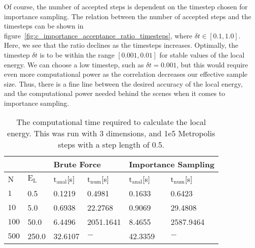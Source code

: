 \documentclass[
    a4paper, aps, twocolumn, floatfix, superscriptaddress,
    nofootinbib]{revtex4-1}
\begin{document}
Of course, the number of accepted steps is dependent on the timestep chosen for importance sampling. The relation between the number of accepted steps and the timesteps can be shown in figure~\ref{fig:c_importance_acceptance_ratio_timesteps}, where $\delta t \in [0.1, 1.0]$. Here, we see that the ratio declines as the timesteps increases. Optimally, the timestep $\delta t$ is to be within the range $[0.001, 0.01]$ for stable values of the local energy. We can choose a low timestep, such as $\delta t = 0.001$, but this would require even more computational power as the correlation decreases our effective sample size. Thus, there is a fine line between the desired accuracy of the local energy, and the computational power needed behind the scenes when it comes to importance sampling.


\begin{table}[h!]
 \caption{The computational time required to calculate the local energy. This was run with 3 dimensions, and 1e5 Metropolis steps with a step length of 0.5.}
 \begin{ruledtabular}
    \begin{tabular}{p{0.5cm}p{1.1cm}p{1.1cm}p{1.1cm}p{1.1cm}p{1.1cm}}
    \multirow{2}{*}{} &
     &
      \multicolumn{2}{l}{Brute Force} &
      \multicolumn{2}{l}{Importance Sampling} \\
    \hline
      N & $\text{E}_{\text{L}}$ & $\text{t}_{\text{anal}}$[\si{\second}] & $\text{t}_{\text{num}}$[\si{\second}]& $\text{t}_{\text{anal}}$[\si{\second}] & $\text{t}_{\text{num}}$[\si{\second}] \\
      \hline
 $1$& 0.5 &  0.1219   &  0.4981   & 0.1633  &  0.6423 \\
 $10$& 5.0 & 0.6938   &   22.2768  & 0.9069    &  29.4808 \\
 $100$& 50.0 &  6.4496  & 2051.1641 &   8.4655    &  2587.9464 \\
 $500$& 250.0 & 32.6107  & $ - $  & 42.3359 & $ - $\\
  \end{tabular}
  \end{ruledtabular}
  \label{tab:c_brute_force_vs_importance_tCPU}
\end{table}

\end{document}
